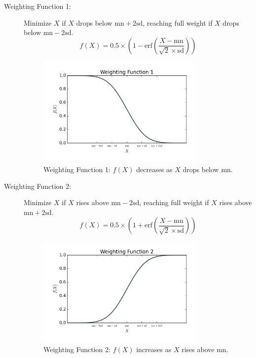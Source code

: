 \documentclass[a4paper,12pt]{article}
\begin{document}
\begin{description}
    \item[Weighting Function 1:] Minimize \(X\) if \(X\) drops below \(\text{mn} + 2\text{sd}\), reaching full weight if \(X\) drops below \(\text{mn} - 2\text{sd}\).
    \begin{equation}
    f(X) = 0.5 \times \left(1 - \text{erf}\left(\frac{X - \text{mn}}{\sqrt{2} \times \text{sd}}\right)\right)
    \end{equation}
    \begin{figure}[H]
        \centering
        \includegraphics[width=0.8\textwidth]{figures/weighting_function_1.png}
        \caption{Weighting Function 1: \(f(X)\) decreases as \(X\) drops below \(\text{mn}\).}
    \end{figure}

    \item[Weighting Function 2:] Minimize \(X\) if \(X\) rises above \(\text{mn} - 2\text{sd}\), reaching full weight if \(X\) rises above \(\text{mn} + 2\text{sd}\).
    \begin{equation}
    f(X) = 0.5 \times \left(1 + \text{erf}\left(\frac{X - \text{mn}}{\sqrt{2} \times \text{sd}}\right)\right)
    \end{equation}
    \begin{figure}[H]
        \centering
        \includegraphics[width=0.8\textwidth]{figures/weighting_function_2.png}
        \caption{Weighting Function 2: \(f(X)\) increases as \(X\) rises above \(\text{mn}\).}
    \end{figure}


\end{description}
\end{document}
